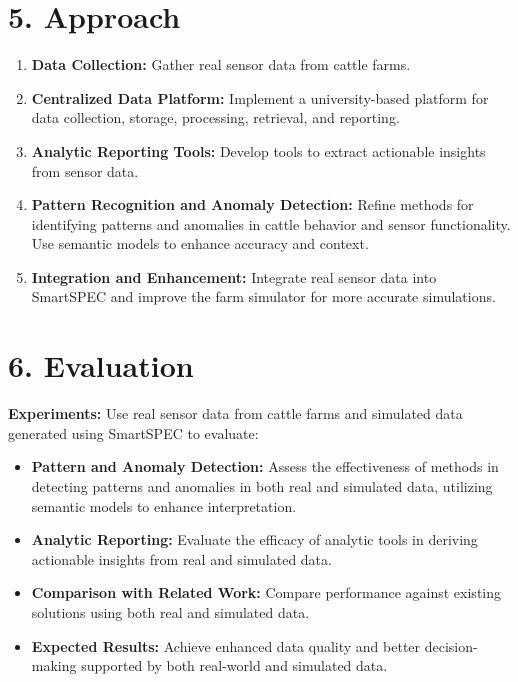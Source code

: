 \documentclass[11pt]{article}
\begin{document}
\section*{5. Approach}
\begin{enumerate}[label=\arabic*., wide=0pt, left=0pt]
    \item \textbf{Data Collection:} Gather real sensor data from cattle farms.
    \item \textbf{Centralized Data Platform:} Implement a university-based platform for data collection, storage, processing, retrieval, and reporting.
    \item \textbf{Analytic Reporting Tools:} Develop tools to extract actionable insights from sensor data.
    \item \textbf{Pattern Recognition and Anomaly Detection:} Refine methods for identifying patterns and anomalies in cattle behavior and sensor functionality. Use semantic models to enhance accuracy and context.
    \item \textbf{Integration and Enhancement:} Integrate real sensor data into SmartSPEC and improve the farm simulator for more accurate simulations.
\end{enumerate}
\section*{6. Evaluation}
\textbf{Experiments:} Use real sensor data from cattle farms and simulated data generated using SmartSPEC to evaluate:
\begin{itemize}
    \item \textbf{Pattern and Anomaly Detection:} Assess the effectiveness of methods in detecting patterns and anomalies in both real and simulated data, utilizing semantic models to enhance interpretation.
    \item \textbf{Analytic Reporting:} Evaluate the efficacy of analytic tools in deriving actionable insights from real and simulated data.
    \item \textbf{Comparison with Related Work:} Compare performance against existing solutions using both real and simulated data.
    \item \textbf{Expected Results:} Achieve enhanced data quality and better decision-making supported by both real-world and simulated data.
\end{itemize}
\end{document}
